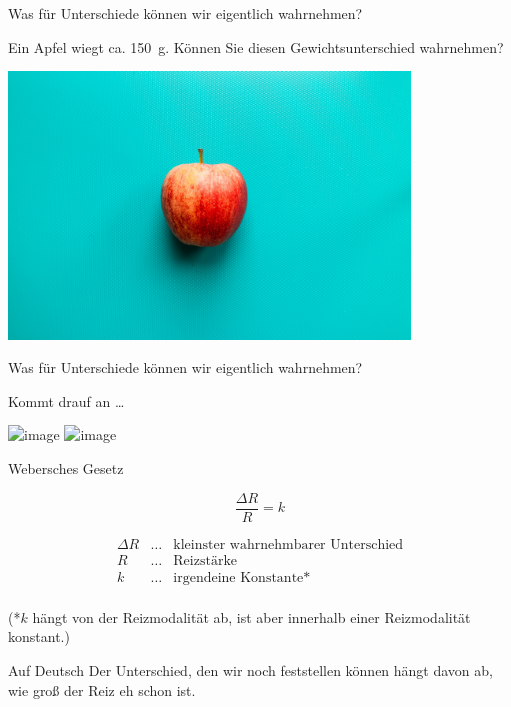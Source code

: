 \documentclass[aspectratio=169]{beamer}
\begin{document}
\begin{frame}{Was für Unterschiede können wir eigentlich wahrnehmen?}

Ein Apfel wiegt ca. \SI{150}{\gram}. Können Sie diesen Gewichtsunterschied wahrnehmen? 


\begin{center}
    \includegraphics[width=0.8\textwidth]{louis-hansel-MardkT836BU-unsplash.jpg}
    
\end{center}

    
\end{frame}


\begin{frame}{Was für Unterschiede können wir eigentlich wahrnehmen?}

Kommt drauf an \dots

\begin{center}
    \includegraphics<1>[width=0.8\textwidth]{priscilla-du-preez-CoqJGsFVJtM-unsplash.jpg}
        \includegraphics<2>[width=0.8\textwidth]{liuba-bilyk-wU_TbWqdPJI-unsplash.jpg}

\end{center}

    
\end{frame}



\begin{frame}{Webersches Gesetz}

\[
\frac{\Delta R}{R} = k
\]

\[
\begin{array}{lll}
\Delta R    & \ldots    & \text{kleinster wahrnehmbarer Unterschied} \\
R           & \ldots    & \text{Reizstärke} \\
k           & \ldots    & \text{irgendeine Konstante*} \\
\end{array}
\]


(*\(k\) hängt von der Reizmodalität ab, ist aber innerhalb einer Reizmodalität konstant.)

\pause

\begin{block}{Auf Deutsch}
Der Unterschied, den wir noch feststellen können hängt davon ab, wie groß der Reiz eh schon ist. 
\end{block}



\end{frame}
\end{document}
